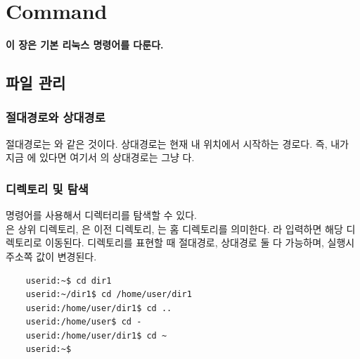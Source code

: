 
\graphicspath{{./chap3/images/}} 
\chapter{Command}
\textbf{이 장은 기본 리눅스 명령어를 다룬다.}
\section{파일 관리}
\subsection{절대경로와 상대경로}
절대경로는 와 같은 것이다. 상대경로는 현재 내 위치에서 시작하는 경로다. 즉, 내가 지금 에 있다면 여기서 의 상대경로는 그냥 다.
\subsection{디렉토리 및 탐색}
 명령어를 사용해서 디렉터리를 탐색할 수 있다. \\ 은 상위 디렉토리, \code{-}은 이전 디렉토리, \code{~}는 홈 디렉토리를 의미한다. 라 입력하면 해당 디렉토리로 이동된다. 디렉토리를 표현할 때 절대경로, 상대경로 둘 다 가능하며, 실행시 주소쪽 값이 변경된다.
\begin{lstlisting}
    userid:~$ cd dir1
    userid:~/dir1$ cd /home/user/dir1 
    userid:/home/user/dir1$ cd ..
    userid:/home/user$ cd -
    userid:/home/user/dir1$ cd ~
    userid:~$
\end{lstlisting}
